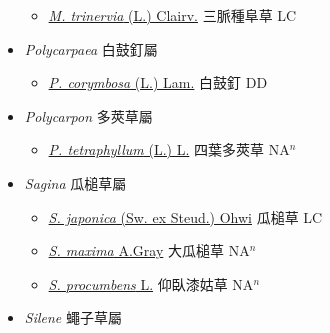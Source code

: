 \begin{itemize}
  \begin{itemize}
        \item[] \href{http://www.theplantlist.org/tpl1.1/search?q=Moehringia+trinervia}{\textit{M. trinervia} (L.) Clairv.}   三脈種阜草 LC
  \end{itemize}
 \item[] \textit{Polycarpaea} 白鼓釘屬
                    
  \begin{itemize}
        \item[] \href{http://www.theplantlist.org/tpl1.1/search?q=Polycarpaea+corymbosa}{\textit{P. corymbosa} (L.) Lam.}   白鼓釘 DD
  \end{itemize}
 \item[] \textit{Polycarpon} 多莢草屬
                    
  \begin{itemize}
        \item[] \href{http://www.theplantlist.org/tpl1.1/search?q=Polycarpon+tetraphyllum}{\textit{P. tetraphyllum} (L.) L.}   四葉多莢草 NA$^n$
  \end{itemize}
 \item[] \textit{Sagina} 瓜槌草屬
                    
  \begin{itemize}
        \item[] \href{http://www.theplantlist.org/tpl1.1/search?q=Sagina+japonica}{\textit{S. japonica} (Sw. ex Steud.) Ohwi}   瓜槌草 LC
        \item[] \href{http://www.theplantlist.org/tpl1.1/search?q=Sagina+maxima}{\textit{S. maxima} A.Gray}   大瓜槌草 NA$^n$
        \item[] \href{http://www.theplantlist.org/tpl1.1/search?q=Sagina+procumbens}{\textit{S. procumbens} L.}   仰臥漆姑草 NA$^n$
  \end{itemize}
 \item[] \textit{Silene} 蠅子草屬
                    

\end{itemize}

